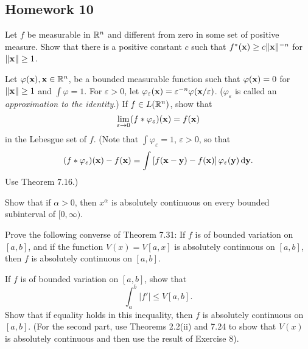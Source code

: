 \subsection{Homework 10}
\begin{problem}
  Let $f$ be measurable in $\mathbb{R}^n$ and different from zero in some set of
  positive measure. Show that there is a positive constant $c$ such that
  $f^*(\mathbf{x})\geq c\|\mathbf{x}\|^{-n}$ for $\|\mathbf{x}\|\geq 1$.
\end{problem}
\begin{solution}
\end{solution}

\begin{problem}
  Let $\varphi(\mathbf{x}),\mathbf{x}\in\mathbb{R}^n$, be a bounded measurable function such
  that $\varphi(\mathbf{x})=0$ for $\|\mathbf{x}\|\geq 1$ and $\int\varphi=1$. For
  $\varepsilon>0$, let
  $\varphi_\varepsilon(\mathbf{x})=\varepsilon^{-n}\varphi(\mathbf{x}/\varepsilon)$.
  ($\varphi_\varepsilon$ is called an \emph{approximation to the
    identity}.) If $f\in L(\mathbb{R}^n)$, show that
  \[
    \lim_{\varepsilon\to 0}(f*\varphi_\varepsilon)(\mathbf{x})=f(\mathbf{x})
  \]
  in the Lebesgue set of $f$. (Note that $\int\varphi_\varepsilon=1$,
  $\varepsilon>0$, so that
  \[
    (f*\varphi_\varepsilon)(\mathbf{x})-f(\mathbf{x})=\int\left[f(\mathbf{x}-\mathbf{y})-f(\mathbf{x})\right]\varphi_\varepsilon(\mathbf{y})\mathop{}\!\mathrm{d}\mathbf{y}.
  \]
  Use Theorem 7.16.)
\end{problem}
\begin{solution}
\end{solution}

\begin{problem}
  Show that if $\alpha>0$, then $x^\alpha$ is absolutely continuous on
  every bounded subinterval of $[0,\infty)$.
\end{problem}
\begin{solution}
\end{solution}

\begin{problem}
  Prove the following converse of Theorem 7.31: If $f$ is of bounded
  variation on $[a,b]$, and if the function $V(x)=V[a,x]$ is absolutely
  continuous on $[a,b]$, then $f$ is absolutely continuous on $[a,b]$.
\end{problem}
\begin{solution}
\end{solution}

\begin{problem}
  If $f$ is of bounded variation on $[a,b]$, show that
  \[
    \int_a^b|f'|\leq V[a,b].
  \]
  Show that if equality holds in this inequality, then $f$ is absolutely
  continuous on $[a,b]$. (For the second part, use Theorems 2.2(ii) and
  7.24 to show that $V(x)$ is absolutely continuous and then use the result
  of Exercise 8).
\end{problem}
\begin{solution}
\end{solution}

